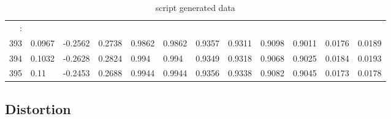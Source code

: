 \begin{table}[p]
{\begin{minipage}{\textheight}
\begin{tabular}{r|lll|ll|llll|ll}
\hline
: &         &         &        &        &        &        &        &        &        &        &        \\
393    & 0.0967  & -0.2562 & 0.2738 & 0.9862 & 0.9862 & 0.9357 & 0.9311 & 0.9098 & 0.9011 & 0.0176 & 0.0189 \\
394    & 0.1032  & -0.2628 & 0.2824 & 0.994  & 0.994  & 0.9349 & 0.9318 & 0.9068 & 0.9025 & 0.0184 & 0.0193 \\
395    & 0.11    & -0.2453 & 0.2688 & 0.9944 & 0.9944 & 0.9356 & 0.9338 & 0.9082 & 0.9045 & 0.0173 & 0.0178
\end{tabular}
       \caption{script generated data}
       \label{tab:spit-out}
     \end{minipage}
   }
 \end{table}

\subsection{Distortion}


